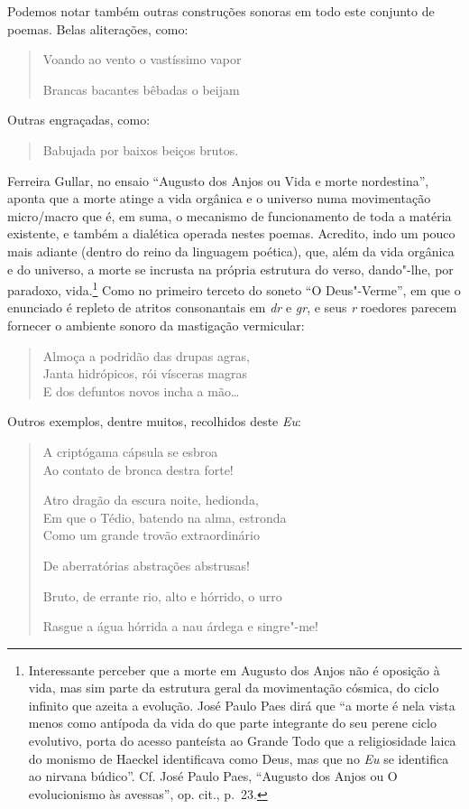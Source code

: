 Podemos notar também outras construções sonoras em todo este
conjunto de poemas. Belas aliterações, como:

\begin{verse}
Voando ao vento o vastíssimo vapor

Brancas bacantes bêbadas o beijam
\end{verse}

Outras engraçadas, como:

\begin{verse}
Babujada por baixos beiços brutos.
\end{verse}

Ferreira Gullar, no ensaio “Augusto dos Anjos ou Vida e morte
nordestina”, aponta que a morte atinge a vida orgânica e o universo
numa movimentação micro/macro que é, em suma, o mecanismo de
funcionamento de toda a matéria existente, e também a dialética operada
nestes poemas. Acredito, indo um pouco mais adiante (dentro do reino da
linguagem poética), que, além da vida orgânica e do universo, a morte
se incrusta na própria estrutura do verso, dando"-lhe, por paradoxo,
vida.\footnote{ Interessante perceber que a morte em Augusto dos Anjos
não é oposição à vida, mas sim parte da estrutura geral da movimentação
cósmica, do ciclo infinito que azeita a evolução. José Paulo Paes dirá
que “a morte é nela vista menos como antípoda da vida do que parte
integrante do seu perene ciclo evolutivo, porta do acesso panteísta ao
Grande Todo que a religiosidade laica do monismo de Haeckel
identificava como Deus, mas que no \textit{Eu} se identifica ao nirvana
búdico”. Cf. José Paulo Paes, “Augusto dos Anjos ou O evolucionismo às
avessas”, op. cit., p.~23.} Como no primeiro terceto do soneto “O
Deus"-Verme”, em que o enunciado é repleto de atritos consonantais em
\textit{dr} e \textit{gr}, e seus \textit{r} roedores parecem fornecer
o ambiente sonoro da mastigação vermicular: 

\begin{verse}
Almoça a podridão das drupas agras,\\
Janta hidrópicos, rói vísceras magras\\
E dos defuntos novos incha a mão\ldots{}
\end{verse}

Outros exemplos, dentre muitos, recolhidos deste \textit{Eu}:

\begin{verse}
A criptógama cápsula se esbroa\\
Ao contato de bronca destra forte!

Atro dragão da escura noite, hedionda,\\
Em que o Tédio, batendo na alma, estronda\\
Como um grande trovão extraordinário

De aberratórias abstrações abstrusas!

Bruto, de errante rio, alto e hórrido, o urro

Rasgue a água hórrida a nau árdega e singre"-me!
\end{verse}

